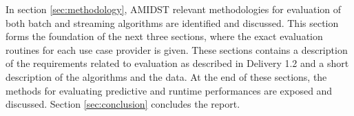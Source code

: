 In section \ref{sec:methodology}, AMIDST relevant methodologies for evaluation of both batch and streaming algorithms are identified and discussed.  This section forms the foundation of the next three sections, where the exact evaluation routines for each use case provider is given. These sections contains a description of the requirements related to evaluation as described in Delivery 1.2 and a short description of the algorithms and the data.  At the end of these sections, the methods for evaluating predictive and runtime performances are exposed and discussed.  Section \ref{sec:conclusion} concludes the report.

%



%
%
